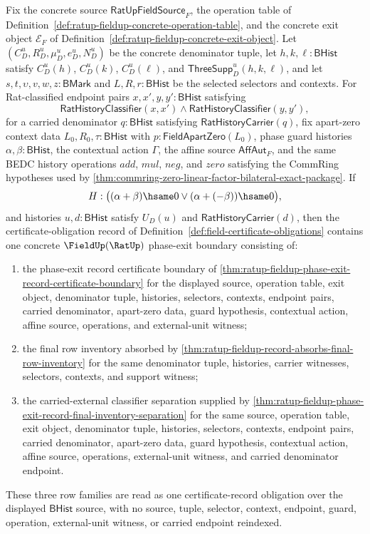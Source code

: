 \begin{theorem}
\label{thm:ratup-fieldup-certificate-record-absorbs-phase-exit-boundary}
Fix the concrete source $\mathsf{RatUpFieldSource}_F$, the operation table of
Definition~\ref{def:ratup-fieldup-concrete-operation-table}, and the concrete
exit object $\mathcal E_F$ of
Definition~\ref{def:ratup-fieldup-concrete-exit-object}. Let
$(C_D^u,R_D^u,\mu_D^u,e_D^u,N_D^u)$ be the concrete denominator tuple, let
$h,k,\ell:\mathsf{BHist}$ satisfy $C_D^u(h)$, $C_D^u(k)$, $C_D^u(\ell)$, and
$\mathsf{ThreeSupp}_D^u(h,k,\ell)$, and let
$s,t,\upsilon,v,w,z:\mathsf{BMark}$ and $L,R,r:\mathsf{BHist}$ be the selected
selectors and contexts. For Rat-classified endpoint pairs
$x,x',y,y':\mathsf{BHist}$ satisfying
$$
\mathsf{RatHistoryClassifier}(x,x')
\land
\mathsf{RatHistoryClassifier}(y,y'),
$$
for a carried denominator $q:\mathsf{BHist}$ satisfying
$\mathsf{RatHistoryCarrier}(q)$, fix apart-zero context data
$L_0,R_0,\tau:\mathsf{BHist}$ with $p:\mathsf{FieldApartZero}(L_0)$, phase
guard histories $\alpha,\beta:\mathsf{BHist}$, the contextual action
$\Gamma$, the affine source $\mathsf{AffAut}_F$, and the same BEDC history
operations $add$, $mul$, $neg$, and $zero$ satisfying the CommRing hypotheses
used by \autoref{thm:commring-zero-linear-factor-bilateral-exact-package}. If
$$
H:\bigl((\alpha+\beta)\hsame0 \lor (\alpha+(-\beta))\hsame0\bigr),
$$
and histories $u,d:\mathsf{BHist}$ satisfy $U_D(u)$ and
$\mathsf{RatHistoryCarrier}(d)$, then the certificate-obligation record of
Definition~\ref{def:field-certificate-obligations} contains one concrete
$\FieldUp(\RatUp)$ phase-exit boundary consisting of:
\begin{enumerate}
  \item the phase-exit record certificate boundary of
  \autoref{thm:ratup-fieldup-phase-exit-record-certificate-boundary} for the
  displayed source, operation table, exit object, denominator tuple, histories,
  selectors, contexts, endpoint pairs, carried denominator, apart-zero data,
  guard hypothesis, contextual action, affine source, operations, and
  external-unit witness;
  \item the final row inventory absorbed by
  \autoref{thm:ratup-fieldup-record-absorbs-final-row-inventory} for the same
  denominator tuple, histories, carrier witnesses, selectors, contexts, and
  support witness;
  \item the carried-external classifier separation supplied by
  \autoref{thm:ratup-fieldup-phase-exit-record-final-inventory-separation} for
  the same source, operation table, exit object, denominator tuple, histories,
  selectors, contexts, endpoint pairs, carried denominator, apart-zero data,
  guard hypothesis, contextual action, affine source, operations,
  external-unit witness, and carried denominator endpoint.
\end{enumerate}
These three row families are read as one certificate-record obligation over the
displayed $\mathsf{BHist}$ source, with no source, tuple, selector, context,
endpoint, guard, operation, external-unit witness, or carried endpoint
reindexed.
\end{theorem}
